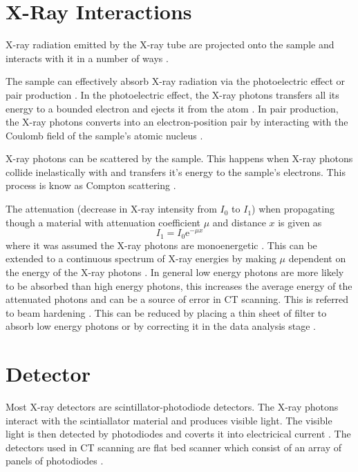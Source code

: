 \documentclass[12pt]{report}
\newcommand{\euler}{\mathrm{e}}
\begin{document}
\section{X-Ray Interactions}
X-ray radiation emitted by the X-ray tube are projected onto the sample and interacts with it in a number of ways \cite{cantatore2011introduction}.

The sample can effectively absorb X-ray radiation via the photoelectric effect or pair production \cite{cantatore2011introduction}. In the photoelectric effect, the X-ray photons transfers all its energy to a bounded electron and ejects it from the atom \cite{millikan1916direct}. In pair production, the X-ray photons converts into an electron-position pair by interacting with the Coulomb field of the sample's atomic nucleus \cite{hubbell2006electron}.

X-ray photons can be scattered by the sample. This happens when X-ray photons collide inelastically with and transfers it's energy to the sample's electrons. This process is know as Compton scattering \cite{compton1923quantum}.

The attenuation (decrease in X-ray intensity from $I_0$ to $I_1$) when propagating though a material with attenuation coefficient $\mu$ and distance $x$ is given as
\begin{equation}
I_1 = I_0\euler^{-\mu x}
\end{equation}
where it was assumed the X-ray photons are monoenergetic \cite{michael2001x}. This can be extended to a continuous spectrum of X-ray energies by making $\mu$ dependent on the energy of the X-ray photons \cite{cantatore2011introduction}. In general low energy photons are more likely to be absorbed than high energy photons, this increases the average energy of the attenuated photons and can be a source of error in CT scanning. This is referred to beam hardening \cite{michael2001x}. This can be reduced by placing a thin sheet of filter to absorb low energy photons \cite{welkenhuyzen2009industrial} or by correcting it in the data analysis stage \cite{michael2001x}.

\section{Detector}
Most X-ray detectors are scintillator-photodiode detectors. The X-ray photons interact with the scintiallator material and produces visible light. The visible light is then detected by photodiodes and coverts it into electricical current \cite{michael2001x}. The detectors used in CT scanning are flat bed scanner which consist of an array of panels of photodiodes \cite{cantatore2011introduction}.
\end{document}
